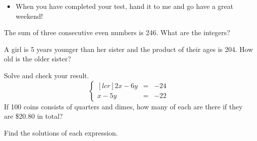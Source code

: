 \documentclass[12pt,letterpaper]{exam}
\begin{document}
\begin{itemize}

\item When you have completed your test, hand it to me and go have a great weekend!


\end{itemize}

\newpage

\begin{questions}
\addpoints
\question[5] 
The sum of three consecutive even numbers is 246.  What are the integers?
    \vfill

\question[5] A girl is 5 years younger than her sister and the product of their ages is 204.  How old is the older sister?
\vfill

\newpage 
\addpoints
\question[10] Solve and check your result.
$$
 \displaystyle \left\{\begin{aligned}[lcr] 2x-6y & = &  -24 \\ x-5y & = &  -22 \end{aligned}\right.
$$
\vfill
\question[10] If 100 coins consists of quarters and dimes, how many of each are there if they are \$20.80 in total?
\vfill

\newpage 
\addpoints

\question
{}



\newpage
\addpoints
\question Find the solutions of each expression.
\end{questions}
\end{document}
